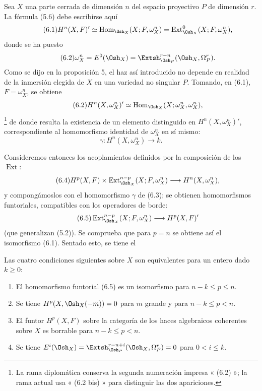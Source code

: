
Sea $X$ una parte cerrada de dimensión $n$ del espacio proyectivo $P$ de
dimensión $r$. La fórmula (5.6) debe escribirse aquí
\begin{equation}\tag{6.1}
  H^{n}(X,F)'
  \simeq\operatorname{Hom}_{\Osh_X}(X;F,\omega_X^{n})
  =\operatorname{Ext}_{\Osh_X}^{0}(X;F,\omega_X^{n}),
\end{equation}
donde se ha puesto
\begin{equation}\tag{6.2}
  \omega_X^{n}=E^{0}(\Osh_X)
  =\Extsh_{\Osh_P}^{r-n}(\Osh_X,\Omega_P^{r}).
\end{equation}
Como se dijo en la proposición 5, el haz así introducido no depende
en realidad de la inmersión elegida de $X$ en una variedad no singular $P$.
Tomando, en (6.1), $F=\omega_X^{n}$, se obtiene
\begin{equation}\tag{6.2}
  H^{n}(X,\omega_X^{n})'
  \simeq\operatorname{Hom}_{\Osh_X}(X;\omega_X^{n},\omega_X^{n}),
\end{equation}
\footnote{La rama diplomática conserva la segunda numeración impresa « (6.2) »;
la rama actual usa « (6.2 bis) » para distinguir las dos apariciones.} de donde
resulta la existencia de un elemento
distinguido en $H^{n}(X,\omega_X^{n})'$, correspondiente al homomorfismo
identidad de $\omega_X^{n}$ en sí mismo:
\begin{equation}\tag{6.3}
  \gamma:H^{n}(X,\omega_X^{n})\longrightarrow k.
\end{equation}

Consideremos entonces los acoplamientos definidos por la composición de los $\operatorname{Ext}$:
\begin{equation}\tag{6.4}
  H^{p}(X,F)\times
  \operatorname{Ext}_{\Osh_X}^{n-p}(X;F,\omega_X^{n})
  \longrightarrow H^{n}(X,\omega_X^{n}),
\end{equation}
y compongámoslos con el homomorfismo $\gamma$ de (6.3); se obtienen
homomorfismos funtoriales, compatibles con los operadores de borde:
\begin{equation}\tag{6.5}
  \operatorname{Ext}_{\Osh_X}^{n-p}(X;F,\omega_X^{n})
  \longrightarrow H^{p}(X,F)'
\end{equation}
(que generalizan (5.2)). Se comprueba que para $p=n$ se obtiene así
el isomorfismo (6.1). Sentado esto, se tiene el

 Las cuatro condiciones siguientes sobre $X$ son
equivalentes para un entero dado $k\geq0$:
\begin{enumerate}
  \item[\textit{i.}] El homomorfismo funtorial (6.5) es un isomorfismo para
    $n-k\leq p\leq n$.
  \item[\textit{ii.}] Se tiene $H^{p}(X,\Osh_X(-m))=0$ para $m$ grande y para
    $n-k\leq p<n$.
  \item[\textit{iii.}] El funtor $H^{p}(X,F)$ sobre la categoría de los haces
    algebraicos coherentes sobre $X$ es borrable para $n-k\leq p<n$.
  \item[\textit{iv.}] Se tiene
    $E^{i}(\Osh_X)=\Extsh_{\Osh_P}^{r-n+i}(\Osh_X,\Omega_P^{r})=0$
    para $0<i\leq k$.
\end{enumerate}

